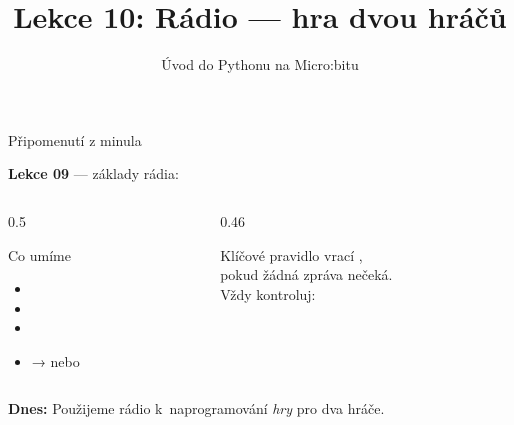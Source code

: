 

\title{Lekce 10: Rádio — hra dvou hráčů}
\subtitle{Úvod do Pythonu na Micro:bitu}
\date{}



\begin{frame}
  \titlepage
\end{frame}

\begin{frame}{Připomenutí z minula}

  \textbf{Lekce 09} — základy rádia:

  \bigskip
  \begin{columns}[T]
    \begin{column}{0.5\textwidth}
      \begin{block}{Co umíme}
        \begin{itemize}
          \item {}
          \item {}
          \item {}
          \item {} →  nebo 
        \end{itemize}
      \end{block}
    \end{column}
    \begin{column}{0.46\textwidth}
      \begin{alertblock}{Klíčové pravidlo}
         vrací ,\\
        pokud žádná zpráva nečeká.\\[6pt]
        Vždy kontroluj:\\
      \end{alertblock}
    \end{column}
  \end{columns}

  \bigskip
  \textbf{Dnes:} Použijeme rádio k~naprogramování \emph{hry} pro dva hráče.

\end{frame}

